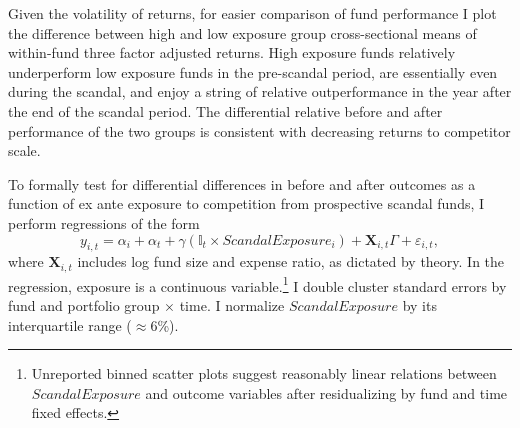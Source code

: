 \documentclass[openany]{book}
\let\rmarkdownfootnote\footnote%
\def\footnote{\protect\rmarkdownfootnote}
\theoremstyle{definition}
\theoremstyle{definition}
\theoremstyle{definition}
\theoremstyle{remark}
\begin{document}
Given the volatility of returns, for easier comparison of fund
performance I plot the difference between high and low exposure group
cross-sectional means of within-fund three factor adjusted returns. High
exposure funds relatively underperform low exposure funds in the
pre-scandal period, are essentially even during the scandal, and enjoy a
string of relative outperformance in the year after the end of the
scandal period. The differential relative before and after performance
of the two groups is consistent with decreasing returns to competitor
scale.

To formally test for differential differences in before and after
outcomes as a function of ex ante exposure to competition from
prospective scandal funds, I perform regressions of the form
\begin{equation}
y_{i,t} = \alpha_i + \alpha_t + \gamma \left( \mathbb{I}_t \times ScandalExposure_i \right) + \mathbf{X}_{i,t}\Gamma + \varepsilon_{i,t},
\label{eq:didReg}
\end{equation} where \(\mathbf{X}_{i,t}\) includes log fund size and
expense ratio, as dictated by theory. In the regression, exposure is a
continuous variable.\footnote{
Unreported binned scatter plots suggest reasonably linear relations between $ScandalExposure$ and outcome variables after residualizing by fund and time fixed effects.
} I double cluster standard errors by fund and portfolio group
\(\times\) time. I normalize \(ScandalExposure\) by its interquartile
range (\(\approx 6\)\%).
\end{document}

